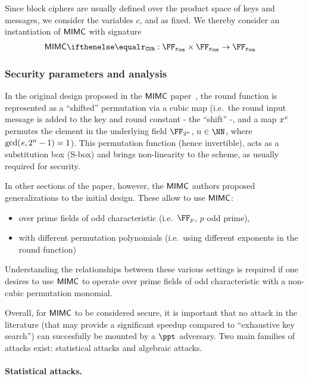 Since block ciphers are usually defined over the product space of keys and messages, we consider the variables $c$, \rounds{} and \exponent{} as fixed. We thereby consider an instantiation of $\mathsf{MIMC{}}$ with signature
\begin{align*}
    \mimcPrime{\rCURVE} &: \FFx{\rCURVE} \times \FFx{\rCURVE} \to \FFx{\rCURVE}
\end{align*}

\subsubsection{Security parameters and analysis}\label{instantiation:mkhash:mimc-encryption:security}

In the original design proposed in the $\mathsf{MIMC{}}$ paper~\cite{albrecht2016mimc}, the round function is represented as a ``shifted'' permutation via a cubic map (i.e.~the round input message is added to the key and round constant - the ``shift'' -, and a map $x^{\mathit{e}{}}$ permutes the element in the underlying field $\FFx{2^n}$, $n \in \NN$, where $\gcd(\mathit{e}{}, 2^n - 1) = 1$). This permutation function (hence invertible), acts as a substitution box (S-box) and brings non-linearity to the scheme, as usually required for security.

In other sections of the paper, however, the $\mathsf{MIMC{}}$ authors proposed generalizations to the initial design. These allow to use $\mathsf{MIMC{}}$:
\begin{itemize}
    \item over prime fields of odd characteristic (i.e.~$\FFx{p}$, $p$ odd prime),
    \item with different permutation polynomials (i.e.~using different exponents in the round function)
\end{itemize}

Understanding the relationships between these various settings is required if one desires to use $\mathsf{MIMC{}}$ to operate over prime fields of odd characteristic with a non-cubic permutation monomial.

Overall, for $\mathsf{MIMC{}}$ to be considered secure, it is important that no attack in the literature  (that may provide a significant speedup compared to ``exhaustive key search'') can succesfully be mounted by a $\ppt$ adversary. Two main families of attacks exist: statistical attacks and algebraic attacks.

\paragraph{Statistical attacks.}

